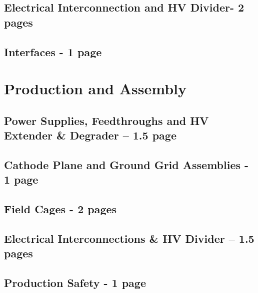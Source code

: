 \subsection{Electrical Interconnection and HV Divider- 2 pages} %
\label{sec:fddp-hv-design-interconnect}

\subsection{Interfaces - 1 page}
\label{sec:fddp-hv-transport-interfaces}


\clearpage
\section{Production and Assembly }
\label{sec:fddp-hv-prod-assy}

\subsection{Power Supplies, Feedthroughs and HV Extender \& Degrader – 1.5 page}
\label{sec:fddp-hv-supplies-feedthroughs}

\subsection{Cathode Plane and Ground Grid Assemblies - 1 page}
\label{sec:fddp-hv-prod-cpa}

\subsection{Field Cages - 2 pages}
\label{sec:fddp-hv-prod-fc}

\subsection{Electrical Interconnections \& HV Divider – 1.5 pages}
\label{sec:fddp-hv-prod-interconnect}
\subsection{Production Safety - 1 page}
\label{sec:fddp-hv-prod-safety}
\clearpage
